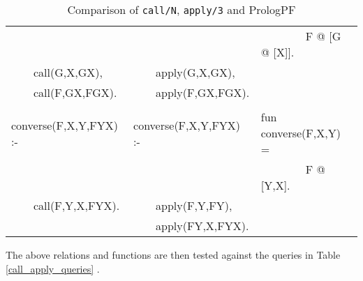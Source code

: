 \begin{table}[htb]
{\begin{tabular}{| l | l | l |}
                           &                           &~~~~~~~~F @ [G @ [X]]. \\
~~~~call(G,X,GX),          &~~~~apply(G,X,GX),         & \\
~~~~call(F,GX,FGX).        &~~~~apply(F,GX,FGX).       & \\
& & \\
converse(F,X,Y,FYX) :-     &converse(F,X,Y,FYX) :-     &fun converse(F,X,Y) =\\
                           &                           &~~~~~~~~F @ [Y,X]. \\
~~~~call(F,Y,X,FYX).       &~~~~apply(F,Y,FY),         &\\
                           &~~~~apply(FY,X,FYX).       &\\
\hline
\end{tabular}
}
\caption{Comparison of \texttt{call/N}, \texttt{apply/3} and PrologPF}
\label{call_apply}
\end{table}

The above relations and functions are then tested against the
queries in Table \ref{call_apply_queries} \cite{Nai96}.


